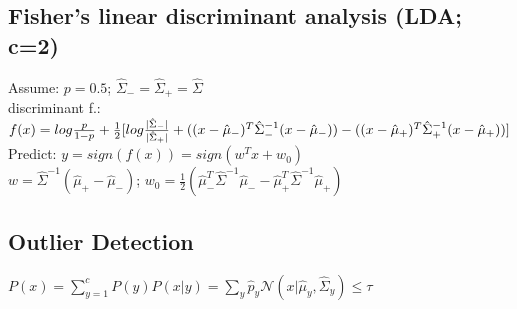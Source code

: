 \subsection*{Fisher's linear discriminant analysis (LDA; c=2)}
Assume: $p = 0.5$; $\hat{\Sigma}_- = \hat{\Sigma}_+ = \hat{\Sigma}$\\
discriminant f.: $f(x) = log \frac{p}{1-p} + \frac{1}{2}[log \frac{|\hat{\Sigma}_-|}{|\hat{\Sigma}_+|}\\
+ ((x - \hat{\mu}_-)^T \hat{\Sigma}_-^{-1} (x - \hat{\mu}_-)) - ((x - \hat{\mu}_+)^T \hat{\Sigma}_+^{-1} (x - \hat{\mu}_+))]$\\
Predict: $y = sign(f(x)) = sign (w^T x + w_0)$\\
$w = \hat{\Sigma}^{-1}(\hat{\mu}_+ - \hat{\mu}_-)$; $w_0 = \frac{1}{2}(\hat{\mu}_-^T\hat{\Sigma}^{-1}\hat{\mu}_- - \hat{\mu}_+^T \hat{\Sigma}^{-1}\hat{\mu}_+)$

\subsection*{Outlier Detection}
$P(x) = \sum_{y=1}^c P(y) P(x|y) = \sum_y \hat{p}_y \mathcal{N}(x|\hat{\mu}_y,\hat{\Sigma}_y) \leq \tau$




